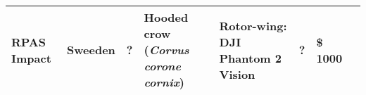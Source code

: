\documentclass[]{interact}
\theoremstyle{plain}%
\theoremstyle{definition}
\theoremstyle{remark}
\begin{document}
\begin{longtable}[]{@{}llllllll@{}}
\begin{minipage}[t]{0.18\columnwidth}
RPAS Impact\strut
\end{minipage} & \begin{minipage}[t]{0.03\columnwidth}\raggedright\strut
Sweeden\strut
\end{minipage} & \begin{minipage}[t]{0.14\columnwidth}\raggedright\strut
?\strut
\end{minipage} & \begin{minipage}[t]{0.10\columnwidth}\raggedright\strut
Hooded crow (\emph{Corvus corone cornix})\strut
\end{minipage} & \begin{minipage}[t]{0.09\columnwidth}\raggedright\strut
Rotor-wing: DJI Phantom 2 Vision\strut
\end{minipage} & \begin{minipage}[t]{0.11\columnwidth}\raggedright\strut
?\strut
\end{minipage} & \begin{minipage}[t]{0.01\columnwidth}\raggedright\strut
\$ 1000\strut
\end{minipage}\tabularnewline
\bottomrule
\end{longtable}
\end{document}
